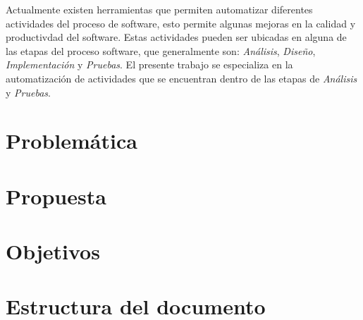 Actualmente existen herramientas que permiten automatizar diferentes actividades del proceso de software, esto permite algunas mejoras en la calidad y productivdad del software. Estas actividades pueden ser ubicadas en alguna de las etapas del proceso software, que generalmente son: {\it Análisis}, {\it Diseño}, {\it Implementación} y {\it Pruebas}. El presente trabajo se especializa en la automatización de actividades que se encuentran dentro de las etapas de {\it Análisis} y {\it Pruebas}.

\section{Problemática}

\section{Propuesta}

\section{Objetivos}

\section{Estructura del documento}

